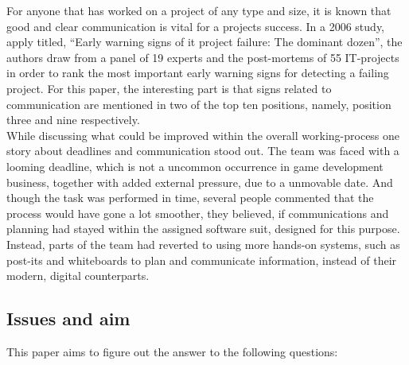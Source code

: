 
For anyone that has worked on a project of any type and size, it is known that
good and clear communication is vital for a projects success. In a 2006 study, apply
titled, \enquote{Early warning signs of it project failure: The dominant
dozen}\cite{c_warning_signs_project_article}, the authors draw from a panel of
19 experts and the post-mortems of 55 IT-projects in order to rank the most
important early warning signs for detecting a failing project. For this
paper, the interesting part is that signs related to communication are mentioned
in two of the top ten positions, namely, position three and nine respectively.
\\

While discussing what could be improved within the overall working-process one
story about deadlines and communication stood out. The team was faced with a
looming deadline, which is not a uncommon occurrence in game development
business, together with added external pressure, due to a unmovable date. And
though the task was performed in time, several people commented that the
process would have gone a lot smoother, they believed, if communications and
planning had stayed within the assigned software suit, designed for this
purpose. Instead, parts of the team had reverted to using more hands-on
systems, such as post-its and whiteboards to plan and communicate information,
instead of their modern, digital counterparts.





\subsection{Issues and aim}


  This paper aims to figure out the answer to the following questions:

